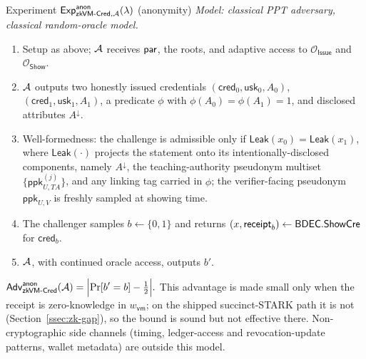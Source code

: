 \begin{gamebox}{Experiment $\mathsf{Exp}^{\mathsf{anon}}_{\mathsf{zkVM\text{-}Cred},\mathcal{A}}(\lambda)$ (anonymity)}
    \emph{Model: classical PPT adversary, classical random-oracle model.}\par\smallskip
    \begin{enumerate}
        \item Setup as above; $\mathcal{A}$ receives $\mathsf{par}$, the roots, and adaptive access to $\mathcal O_{\mathsf{Issue}}$ and $\mathcal O_{\mathsf{Show}}$.
        \item $\mathcal{A}$ outputs two honestly issued credentials $(\mathsf{cred}_0,\mathsf{usk}_0,A_0)$, $(\mathsf{cred}_1,\mathsf{usk}_1,A_1)$, a predicate $\phi$ with $\phi(A_0)=\phi(A_1)=1$, and disclosed attributes $A^\downarrow$.
        \item Well-formedness: the challenge is admissible only if $\mathsf{Leak}(x_0)=\mathsf{Leak}(x_1)$, where $\mathsf{Leak}(\cdot)$ projects the statement onto its intentionally-disclosed components, namely $A^\downarrow$, the teaching-authority pseudonym multiset $\{\mathsf{ppk}_{U,TA}^{(j)}\}$, and any linking tag carried in $\phi$; the verifier-facing pseudonym $\mathsf{ppk}_{U,V}$ is freshly sampled at showing time.
        \item The challenger samples $b\leftarrow\{0,1\}$ and returns $(x,\mathsf{receipt}_b)\leftarrow\mathsf{BDEC}.\mathsf{ShowCre}$ for $\mathsf{cred}_b$.
        \item $\mathcal{A}$, with continued oracle access, outputs $b'$.
    \end{enumerate}
    $\displaystyle
    \mathsf{Adv}^{\mathsf{anon}}_{\mathsf{zkVM\text{-}Cred}}(\mathcal{A})=\Bigl|\Pr[b'=b]-\tfrac12\Bigr|.$ This advantage is made small only when the receipt is zero-knowledge in $w_{\mathsf{vm}}$; on the shipped succinct-STARK path it is not (Section~\ref{ssec:zk-gap}), so the bound is sound but not effective there. Non-cryptographic side channels (timing, ledger-access and revocation-update patterns, wallet metadata) are outside this model.
\end{gamebox}

